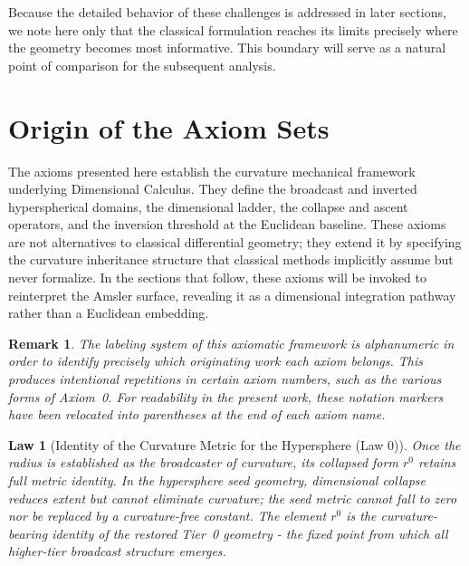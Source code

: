 \documentclass[final,onefignum,onetabnum]{siamart}
\newtheorem{law}{Law}
\newtheorem{remark}{Remark}
\begin{document}
Because the detailed behavior of these challenges is addressed in later sections, we note here only that the classical formulation reaches its limits precisely where the geometry becomes most informative. This boundary will serve as a natural point of comparison for the subsequent analysis.

\section{Origin of the Axiom Sets}

The axioms presented here establish the curvature mechanical framework underlying Dimensional Calculus. They define the broadcast and inverted hyperspherical domains, the dimensional ladder, the collapse and ascent operators, and the inversion threshold at the Euclidean baseline. These axioms are not alternatives to classical differential geometry; they extend it by specifying the curvature inheritance structure that classical methods implicitly assume but never formalize. In the sections that follow, these axioms will be invoked to reinterpret the Amsler surface, revealing it as a dimensional integration pathway rather than a Euclidean embedding.


\begin{remark}
The labeling system of this axiomatic framework is alphanumeric in order to identify precisely which originating work each axiom belongs. This produces intentional repetitions in certain axiom numbers, such as the various forms of
Axiom~0. For readability in the present work, these notation markers have been relocated into parentheses at the end of each axiom name.
\end{remark}

\begin{law}[Identity of the Curvature Metric for the Hypersphere (Law 0)]
Once the radius is established as the broadcaster of curvature, its collapsed form $r^{0}$ retains full metric identity. In the hypersphere seed geometry, dimensional collapse reduces extent but cannot eliminate curvature; the seed metric cannot fall to zero nor be replaced by a curvature-free constant. The element $r^{0}$ is the curvature-bearing identity of the restored Tier~0 geometry - the fixed point from which all higher-tier broadcast structure emerges.
\end{law}
\end{document}
